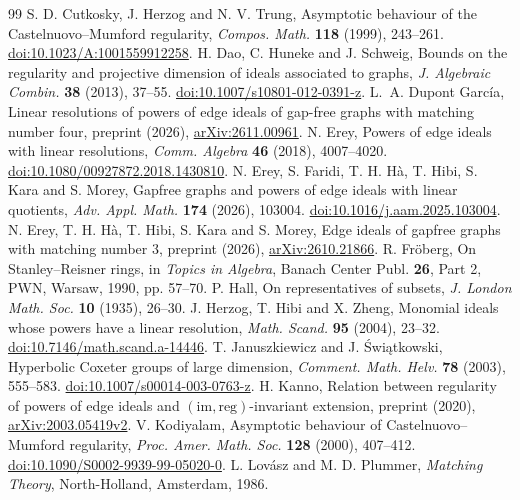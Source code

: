 \documentclass[11pt,a4paper]{article}
\theoremstyle{definition}
\begin{document}
\begin{thebibliography}{99}
 S. D. Cutkosky, J. Herzog and N. V. Trung, Asymptotic behaviour of the Castelnuovo--Mumford regularity, \emph{Compos. Math.} \textbf{118} (1999), 243--261. \href{https://doi.org/10.1023/A:1001559912258}{doi:10.1023/A:1001559912258}.
 H. Dao, C. Huneke and J. Schweig, Bounds on the regularity and projective dimension of ideals associated to graphs, \emph{J. Algebraic Combin.} \textbf{38} (2013), 37--55. \href{https://doi.org/10.1007/s10801-012-0391-z}{doi:10.1007/s10801-012-0391-z}.
 L.~A. Dupont Garc\'ia, Linear resolutions of powers of edge ideals of gap-free graphs with matching number four, preprint (2026), \href{https://arxiv.org/abs/2611.00961}{arXiv:2611.00961}.
 N. Erey, Powers of edge ideals with linear resolutions, \emph{Comm. Algebra} \textbf{46} (2018), 4007--4020. \href{https://doi.org/10.1080/00927872.2018.1430810}{doi:10.1080/00927872.2018.1430810}.
 N. Erey, S. Faridi, T. H. H\`a, T. Hibi, S. Kara and S. Morey, Gapfree graphs and powers of edge ideals with linear quotients, \emph{Adv. Appl. Math.} \textbf{174} (2026), 103004. \href{https://doi.org/10.1016/j.aam.2025.103004}{doi:10.1016/j.aam.2025.103004}.
 N. Erey, T. H. H\`a, T. Hibi, S. Kara and S. Morey, Edge ideals of gapfree graphs with matching number $3$, preprint (2026), \href{https://arxiv.org/abs/2610.21866}{arXiv:2610.21866}.
 R. Fr\"oberg, On Stanley--Reisner rings, in \emph{Topics in Algebra}, Banach Center Publ. \textbf{26}, Part 2, PWN, Warsaw, 1990, pp. 57--70.
 P. Hall, On representatives of subsets, \emph{J. London Math. Soc.} \textbf{10} (1935), 26--30.
 J. Herzog, T. Hibi and X. Zheng, Monomial ideals whose powers have a linear resolution, \emph{Math. Scand.} \textbf{95} (2004), 23--32. \href{https://doi.org/10.7146/math.scand.a-14446}{doi:10.7146/math.scand.a-14446}.
 T. Januszkiewicz and J. \'{S}wi\k{a}tkowski, Hyperbolic Coxeter groups of large dimension, \emph{Comment. Math. Helv.} \textbf{78} (2003), 555--583. \href{https://doi.org/10.1007/s00014-003-0763-z}{doi:10.1007/s00014-003-0763-z}.
 H. Kanno, Relation between regularity of powers of edge ideals and $(\mathrm{im},\mathrm{reg})$-invariant extension, preprint (2020), \href{https://arxiv.org/abs/2003.05419v2}{arXiv:2003.05419v2}.
 V. Kodiyalam, Asymptotic behaviour of Castelnuovo--Mumford regularity, \emph{Proc. Amer. Math. Soc.} \textbf{128} (2000), 407--412. \href{https://doi.org/10.1090/S0002-9939-99-05020-0}{doi:10.1090/S0002-9939-99-05020-0}.
 L. Lov\'asz and M. D. Plummer, \emph{Matching Theory}, North-Holland, Amsterdam, 1986.

\end{thebibliography}
\end{document}
